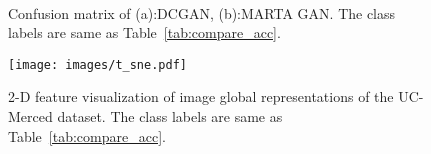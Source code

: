 \documentclass[journal]{IEEEtran}
\begin{document}


%	
%
\begin{figure}[t]
	\centering
	\hfill
	\\
	\caption{Confusion matrix of (a):DCGAN, (b):MARTA GAN. The class labels are same as Table~\ref{tab:compare_acc}.}
	\label{fig:conf_matix} 
		\vspace{-5mm}
\end{figure}

\begin{figure}[t]
	\centering
	\texttt{[image: images/t\_sne.pdf]}
	\vspace{-1.5em}
	\caption{2-D feature visualization of image global representations of the UC-Merced dataset.  The class labels are same as Table~\ref{tab:compare_acc}.}
	\vspace{-4mm}
	\label{fig:t_sne}
\end{figure}
\end{document}
